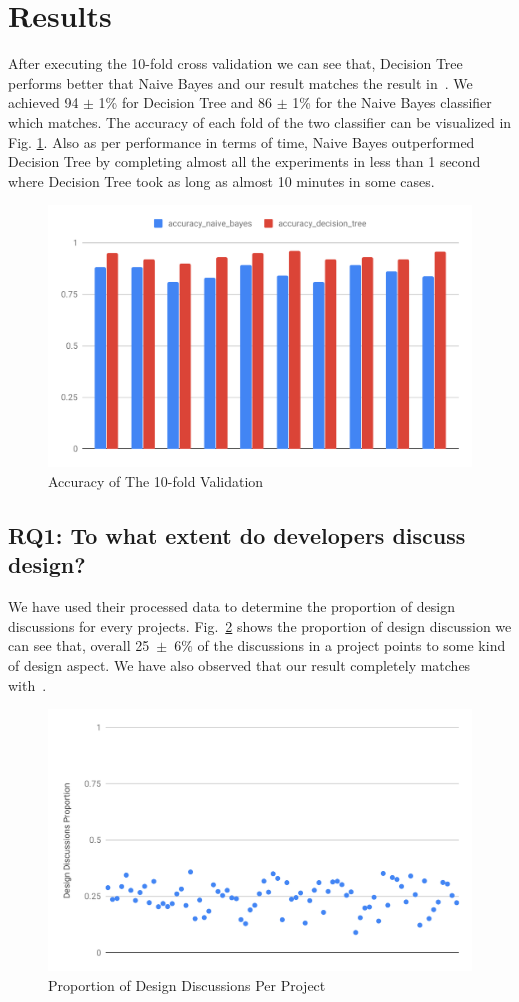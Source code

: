 \section{Results}
\label{sect:results}
After executing the 10-fold cross validation we can see that, Decision Tree performs better that Naive Bayes and our result matches the result in~\cite{Brunet2014a}. We achieved 94 {$\pm$} 1\% for Decision Tree and 86 {$\pm$} 1\% for the Naive Bayes classifier which matches. The accuracy of each fold of the two classifier can be visualized in Fig. \ref{fig:classification}. Also as per performance in terms of time, Naive Bayes outperformed Decision Tree by completing almost all the experiments in less than 1 second where Decision Tree took as long as almost 10 minutes in some cases.
\begin{figure}[hbt]
	\centering
	\includegraphics[width=.45\textwidth]{fig/classification.pdf}
	\caption{Accuracy of The 10-fold Validation}
	\label{fig:classification}
\end{figure}

\subsection{RQ1: To what extent do developers discuss design?}
We have used their processed data to determine the proportion of design discussions for every projects. Fig.~\ref{fig:rq_1} shows the proportion of design discussion we can see that, overall 25~{$\pm$}~6\% of the discussions in a project points to some kind of design aspect. We have also observed that our result completely matches with~\cite{Brunet2014a}.
\begin{figure}[hbt]
	\centering
	\includegraphics[width=.45\textwidth]{fig/rq_1.pdf}
	\caption{Proportion of Design Discussions Per Project}
	\label{fig:rq_1}
\end{figure}

